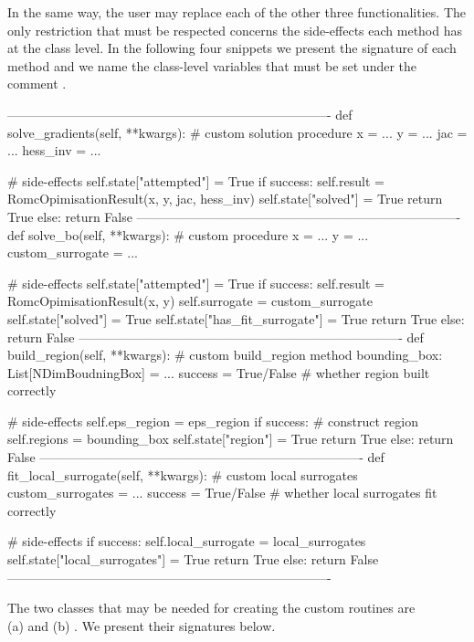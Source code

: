 In the same way, the user may replace each of the other three
functionalities. The only restriction that must be respected concerns
the side-effects each method has at the 
class level. In the following four snippets we present the signature
of each method and we name the class-level variables that must be set
under the comment .


\begin{Code}
----------------------------------------------------------------------------
def solve_gradients(self, **kwargs):
    # custom solution procedure
    x = ...
    y = ...
    jac = ...
    hess_inv = ...

    # side-effects
    self.state["attempted"] = True
    if success:
        self.result = RomcOpimisationResult(x, y, jac, hess_inv)
        self.state["solved"] = True
        return True
    else:
        return False
----------------------------------------------------------------------------
def solve_bo(self, **kwargs):
    # custom procedure
    x = ...
    y = ...
    custom_surrogate = ...

    # side-effects
    self.state["attempted"] = True
    if success:
        self.result = RomcOpimisationResult(x, y)
        self.surrogate = custom_surrogate
        self.state["solved"] = True
        self.state["has_fit_surrogate"] = True
        return True
    else:
        return False
----------------------------------------------------------------------------
def build_region(self, **kwargs):
    # custom build_region method
    bounding_box: List[NDimBoudningBox] = ...
    success = True/False # whether region built correctly

    # side-effects
    self.eps_region = eps_region
    if success:
        # construct region
        self.regions = bounding_box
        self.state["region"] = True
        return True
    else:
        return False
----------------------------------------------------------------------------
def fit_local_surrogate(self, **kwargs):
    # custom local surrogates
    custom_surrogates = ...
    success = True/False # whether local surrogates fit correctly

    # side-effects
    if success:
        self.local_surrogate = local_surrogates
        self.state["local_surrogates"] = True
        return True
    else:
        return False
----------------------------------------------------------------------------
\end{Code}

The two classes that may be needed for creating the custom routines
are \\ (a)  and (b)
. We present their signatures below.

